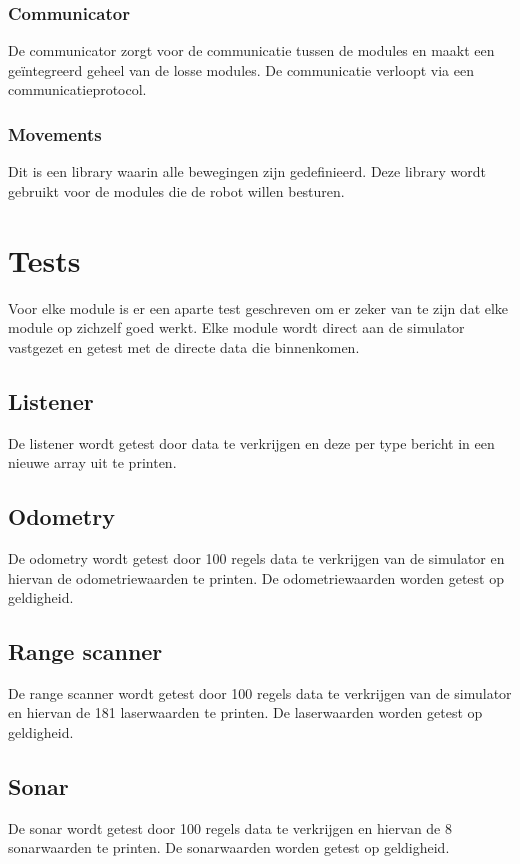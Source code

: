 \documentclass[a4paper,10pt]{article}
\begin{document}
\subsubsection{Communicator}
De communicator zorgt voor de communicatie tussen de modules en maakt een ge\"{i}ntegreerd geheel van de losse modules. De communicatie verloopt via een communicatieprotocol.

\subsubsection{Movements}
Dit is een library waarin alle bewegingen zijn gedefinieerd. Deze library wordt gebruikt voor de modules die de robot willen besturen.

\section{Tests}
Voor elke module is er een aparte test geschreven om er zeker van te zijn dat elke module op zichzelf goed werkt. Elke module wordt direct aan de simulator vastgezet en getest met de directe data die binnenkomen. 

\subsection{Listener}
De listener wordt getest door data te verkrijgen en deze per type bericht in een nieuwe array uit te printen.

\subsection{Odometry}
De odometry wordt getest door 100 regels data te verkrijgen van de simulator en hiervan de odometriewaarden te printen. De odometriewaarden worden getest op geldigheid.

\subsection{Range scanner}
De range scanner wordt getest door 100 regels data te verkrijgen van de simulator en hiervan de 181 laserwaarden te printen. De laserwaarden worden getest op geldigheid.

\subsection{Sonar}
De sonar wordt getest door 100 regels data te verkrijgen en  hiervan de 8 sonarwaarden te printen. De sonarwaarden worden getest op geldigheid.
\end{document}
